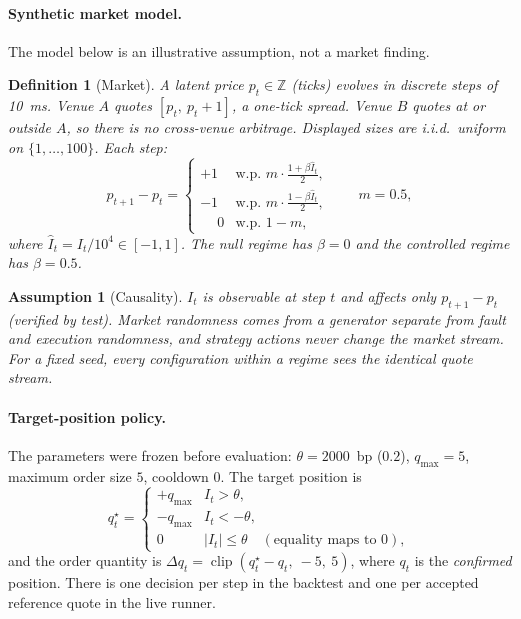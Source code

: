 \documentclass[11pt]{article}
\newtheorem{definition}{Definition}
\newtheorem{assumption}{Assumption}
\theoremstyle{remark}
\newcommand{\Z}{\mathbb{Z}}
\begin{document}
\paragraph{Synthetic market model.}

The model below is an illustrative assumption, not a market finding.

\begin{definition}[Market]
A latent price $p_t \in \Z$ (ticks) evolves in discrete steps of 10~ms. Venue $A$ quotes
$[p_t,\ p_t + 1]$, a one-tick spread. Venue $B$ quotes at or outside $A$, so there is no
cross-venue arbitrage. Displayed sizes are i.i.d.\ uniform on $\{1,\dots,100\}$. Each step:
\begin{equation}
  p_{t+1} - p_t =
  \begin{cases}
    +1 & \text{w.p. } m \cdot \tfrac{1 + \beta \hat I_t}{2},\\[2pt]
    -1 & \text{w.p. } m \cdot \tfrac{1 - \beta \hat I_t}{2},\\[2pt]
    \phantom{+}0 & \text{w.p. } 1 - m,
  \end{cases}
  \qquad m = 0.5,
\end{equation}
where $\hat I_t = I_t / 10^4 \in [-1, 1]$. The \emph{null} regime has $\beta = 0$ and the
\emph{controlled} regime has $\beta = 0.5$.
\end{definition}

\begin{assumption}[Causality]
$I_t$ is observable at step $t$ and affects only $p_{t+1} - p_t$ (verified by test). Market
randomness comes from a generator separate from fault and execution randomness, and strategy
actions never change the market stream. For a fixed seed, every configuration within a regime
sees the identical quote stream.
\end{assumption}

\paragraph{Target-position policy.}

The parameters were frozen before evaluation: $\theta = 2000$~bp ($0.2$), $q_{\max} = 5$,
maximum order size $5$, cooldown $0$. The target position is
\begin{equation}
  q^\star_t =
  \begin{cases}
    +q_{\max} & I_t > \theta,\\
    -q_{\max} & I_t < -\theta,\\
    0         & |I_t| \le \theta \quad (\text{equality maps to } 0),
  \end{cases}
\end{equation}
and the order quantity is $\Delta q_t = \operatorname{clip}(q^\star_t - q_t,\ -5,\ 5)$, where
$q_t$ is the \emph{confirmed} position. There is one decision per step in the backtest and one
per accepted reference quote in the live runner.
\end{document}
